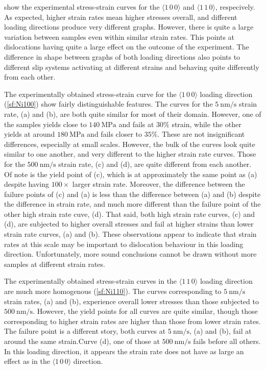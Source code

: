  show the experimental stress-strain curves for the $\langle 1\,0\,0 \rangle$ and $\langle 1\,1\,0 \rangle$, respecively. As expected, higher strain rates mean higher stresses overall, and different loading directions produce very different graphs. However, there is quite a large variation between samples even within similar strain rates. This points at dislocations having quite a large effect on the outcome of the experiment. The difference in shape between graphs of both loading directions also points to different slip systems activating at different strains and behaving quite differently from each other.

The experimentally obtained stress-strain curve for the $\langle 1\,0\,0 \rangle$ loading direction (\cref{sf:Ni100}) show fairly distinguishable features. The curves for the $\SI{5}{\nano\meter\per\second}$ strain rate, (a) and (b), are both quite similar for most of their domain. However, one of the samples yields close to $\SI{140}{\mega\pascal}$ and fails at $30\%$ strain, while the other yields at around $\SI{180}{\mega\pascal}$ and fails closer to $35\%$. These are not insignificant differences, especially at small scales. However, the bulk of the curves look quite similar to one another, and very different to the higher strain rate curves. Those for the $\SI{500}{\nano\metre\per\second}$ strain rate, (c) and (d), are quite different from each another. Of note is the yield point of (c), which is at approximately the same point as (a) despite having $100\times$ larger strain rate. Moreover, the difference between the failure points of (c) and (a) is less than the difference between (a) and (b) despite the difference in strain rate, and much more different than the failure point of the other high strain rate cuve, (d). That said, both high strain rate curves, (c) and (d), are subjected to higher overall stresses and fail at higher strains than lower strain rate curves, (a) and (b). These observations appear to indicate that strain rates at this scale may be important to dislocation behaviour in this loading direction. Unfortunately, more sound conclusions cannot be drawn without more samples at different strain rates.

The experimentally obtained stress-strain curves in the $\langle 1\,1\,0\rangle$ loading direction are much more homogenous (\cref{sf:Ni110}). The curves corresponding to $\SI{5}{\nano\metre\per\second}$ strain rates, (a) and (b), experience overall lower stresses than those subjected to $\SI{500}{\nano\metre\per\second}$. However, the yield points for all curves are quite similar, though those corresponding to higher strain rates are higher than those from lower strain rates. The failure point is a different story, both curves at $\SI{5}{\nano\metre\per\second}$, (a) and (b), fail at around the same strain.Curve (d), one of those at $\SI{500}{\nano\metre\per\second}$ fails before all others. In this loading direction, it appears the strain rate does not have as large an effect as in the $\langle 1\,0\,0 \rangle$ direction.

